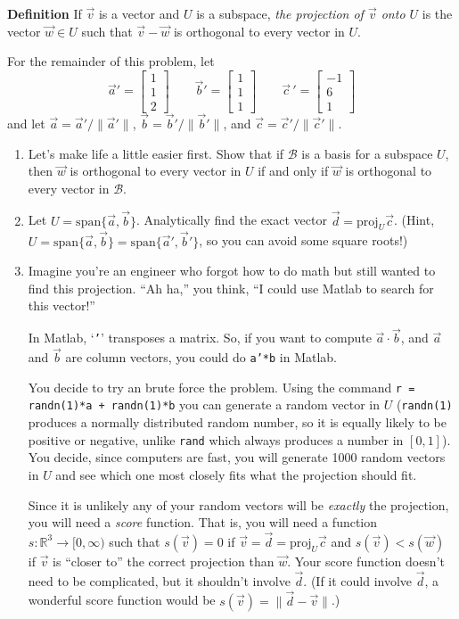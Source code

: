 \documentclass[letter]{article}
\newcommand{\R}{\mathbb{R}}
\newcommand{\Proj}{\mathrm{proj}}
\newcommand{\proj}{\mathrm{proj}}
\newcommand{\Span}{\mathrm{span}}
\newcommand{\mat}[1]{\begin{bmatrix}#1\end{bmatrix}}
\begin{document}
\begin{enumerate}
		{\bf Definition}  If $\vec v$ is a vector and $U$ is a subspace, \emph{the projection of 
		$\vec v$ onto $U$} is the vector $\vec w\in U$ such that $\vec v-\vec w$ is orthogonal to
		every vector in $U$.

		For the remainder of this problem, let 
		\[
			\vec a'=\mat{1\\1\\2}\qquad \vec b'=\mat{1\\1\\1}\qquad \vec c\,' = \mat{-1\\6\\1}
		\]
		and let $\vec a=\vec a'/\|\vec a'\|$, $\vec b=\vec b'/\|\vec b'\|$, and $\vec c=\vec c'/\|\vec c'\|$.

		\begin{enumerate}
			\item Let's make life a little easier first.  Show that if $\mathcal B$ is a basis
				for a subspace $U$, then $\vec w$ is orthogonal to every vector in $U$ if
				and only if $\vec w$ is orthogonal to every vector in $\mathcal B$.
			\item Let $U=\Span\{\vec a,\vec b\}$.  Analytically find the exact vector
				$\vec d=\proj_U\vec c$. (Hint, $U=\Span\{\vec a,\vec b\}=\Span\{\vec a',\vec b'\}$,
				so you can avoid some square roots!)
			\item Imagine you're an engineer who forgot how to do math but still wanted to
				find this projection.  ``Ah ha,'' you think, ``I could use Matlab to
				search for this vector!''

				In Matlab, `\texttt{'}' transposes a matrix.  So, if you want
				to compute $\vec a\cdot \vec b$, and $\vec a$ and $\vec b$ are column
				vectors, you could do \texttt{a'*b} in Matlab.

				You decide to try an brute force the problem.  Using the command \texttt{r = randn(1)*a + randn(1)*b}
				you can generate a random vector in $U$ (\texttt{randn(1)} produces a normally distributed
				random number, so it is equally likely to be positive or negative, unlike \texttt{rand} which always
				produces a number in $[0,1]$).  You decide, since computers are fast, you will generate
				1000 random vectors in $U$ and see which one most closely fits what the projection should fit.

				Since it is unlikely any of your random vectors will be \emph{exactly} the projection,
				you will need a \emph{score} function.  That is, you will need a function $s:\R^3\to[0,\infty)$
				such that $s(\vec v)=0$ if $\vec v=\vec d=\Proj_U\vec c$ and $s(\vec v) < s(\vec w)$ if
				$\vec v$ is ``closer to'' the correct projection than $\vec w$.  Your score function
				doesn't need to be complicated, but it shouldn't involve $\vec d$.  
				(If it could involve $\vec d$, a wonderful
				score function would be $s(\vec v) = \|\vec d-\vec v\|$.)


\end{enumerate}
\end{enumerate}
\end{document}
